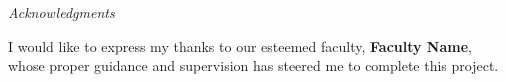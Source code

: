 \cleardoublepage
{}

\begin{center}

\emph{\LARGE Acknowledgments}\\[2.5cm]
\end{center}
\vspace{0.5in}
I would like to express my thanks to our esteemed faculty, \textbf{Faculty Name},
whose proper guidance and supervision has steered me to complete this project.


\newpage
